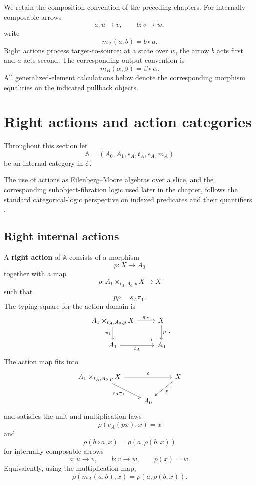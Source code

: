 We retain the composition convention of the preceding chapters.  For
internally composable arrows
\[
    a:u\to v,
    \qquad
    b:v\to w,
\]
write
\[
    m_A(a,b)=b\circ a.
\]
Right actions process target-to-source: at a state over \(w\), the arrow
\(b\) acts first and \(a\) acts second.  The corresponding output convention
is
\[
    m_B(\alpha,\beta)=\beta\circ\alpha.
\]
All generalized-element calculations below denote the corresponding morphism
equalities on the indicated pullback objects.

\section{Right actions and action categories}
\label{sec:relative-right-actions-action-categories}

Throughout this section let
\[
\mathbb A=(A_0,A_1,s_A,t_A,e_A,m_A)
\]
be an internal category in \(\mathcal E\).

The use of actions as Eilenberg--Moore algebras over a slice, and the
corresponding subobject-fibration logic used later in the chapter, follows the
standard categorical-logic perspective on indexed predicates and their
quantifiers \cite{Jacobs1999CategoricalLogic}.

\subsection{Right internal actions}
\label{subsec:relative-right-actions}

\begin{definition}
\label{def:relative-right-action}
A \textbf{right action} of \(\mathbb A\) consists of a morphism
\[
p:X\to A_0
\]
together with a map
\[
\rho:
A_1\times_{t_A,A_0,p}X\to X
\]
such that
\[
p\rho=s_A\pi_1.
\]
The typing square for the action domain is
\[
\begin{tikzcd}
A_1\times_{t_A,A_0,p}X
\arrow[r,"\pi_X"]
\arrow[d,"\pi_1"']
&
X
\arrow[d,"p"]
\\
A_1
\arrow[r,"t_A"']
&
A_0
\arrow[ul,phantom,very near start,"\lrcorner"]
\end{tikzcd}
.
\]
The action map fits into
\[
\begin{tikzcd}
A_1\times_{t_A,A_0,p}X
\arrow[rr,"\rho"]
\arrow[dr,"s_A\pi_1"']
&&
X
\arrow[dl,"p"]
\\
& A_0 &
\end{tikzcd}
\]
and satisfies the unit and multiplication laws
\[
\rho(e_A(px),x)=x
\]
and
\[
\rho(b\circ a,x)=\rho(a,\rho(b,x))
\]
for internally composable arrows
\[
a:u\to v,
\qquad
b:v\to w,
\qquad
p(x)=w.
\]
Equivalently, using the multiplication map,
\[
\rho(m_A(a,b),x)=\rho(a,\rho(b,x)).
\]
\end{definition}

